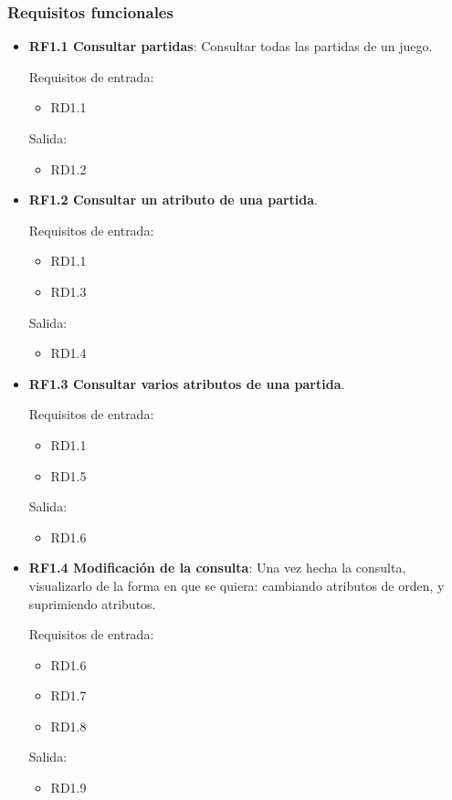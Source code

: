 \subsubsection{Requisitos funcionales}
\begin{itemize}
	\item \textbf{RF1.1 Consultar partidas}: Consultar todas las partidas de un juego.
	
	Requisitos de entrada:
	\begin{itemize}
		\item RD1.1
	\end{itemize}
	Salida:
	\begin{itemize}
		\item RD1.2
	\end{itemize}
	
	
	\item \textbf{RF1.2 Consultar un atributo de una partida}. 
	
	Requisitos de entrada:
	\begin{itemize}
		\item RD1.1
		\item RD1.3
	\end{itemize}
	Salida:
	\begin{itemize}
		\item RD1.4
	\end{itemize}
	
	
	\item \textbf{RF1.3 Consultar varios atributos de una partida}. 
	
	Requisitos de entrada:
	\begin{itemize}
		\item RD1.1
		\item RD1.5
	\end{itemize}
	Salida:
	\begin{itemize}
		\item RD1.6
	\end{itemize}
	
	
	\item \textbf{RF1.4 Modificación de la consulta}: Una vez hecha la consulta, visualizarlo de la forma en que se quiera: cambiando atributos de orden, y suprimiendo atributos.
	
	Requisitos de entrada:
	\begin{itemize}
		\item RD1.6
		\item RD1.7
		\item RD1.8
	\end{itemize}
	Salida:
	\begin{itemize}
		\item RD1.9
	\end{itemize}
	

\end{itemize}
